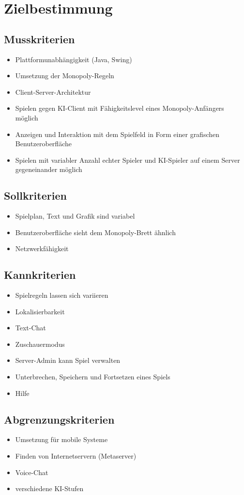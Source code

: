 \documentclass[a4paper,10pt]{article}
\begin{document}
\section{Zielbestimmung}
\subsection{Musskriterien}
\begin{itemize}
\item Plattformunabhängigkeit (Java, Swing)
\item Umsetzung der Monopoly-Regeln
\item Client-Server-Architektur
\item Spielen gegen KI-Client mit Fähigkeitslevel eines Monopoly-Anfängers möglich
\item Anzeigen und Interaktion mit dem Spielfeld in Form einer grafischen Benutzeroberfläche
\item Spielen mit variabler Anzahl echter Spieler und KI-Spieler auf einem Server gegeneinander möglich
\end{itemize}
\subsection{Sollkriterien}
\begin{itemize}
\item Spielplan, Text und Grafik sind variabel
\item Benutzeroberfläche sieht dem Monopoly-Brett ähnlich
\item Netzwerkfähigkeit
\end{itemize}
\subsection{Kannkriterien}
\begin{itemize}
\item Spielregeln lassen sich variieren
\item Lokalisierbarkeit
\item Text-Chat
\item Zuschauermodus
\item Server-Admin kann Spiel verwalten
\item Unterbrechen, Speichern und Fortsetzen eines Spiels
\item Hilfe
\end{itemize}
\subsection{Abgrenzungskriterien}
\begin{itemize}
\item Umsetzung für mobile Systeme 
\item Finden von Internetservern (Metaserver)
\item Voice-Chat
\item verschiedene KI-Stufen
\end{itemize}
\newpage
\end{document}
